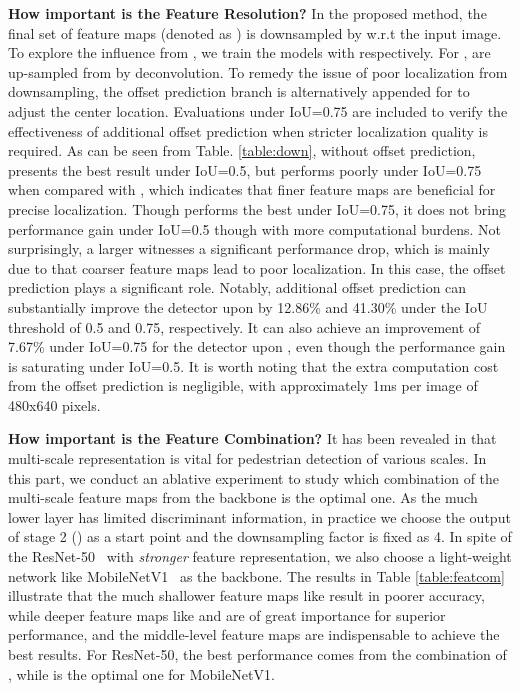 \textbf{How important is the Feature Resolution?}
In the proposed method, the final set of feature maps (denoted as ) is downsampled by  w.r.t the input image. To explore the influence from , we train the models with  respectively. For ,  are up-sampled from  by deconvolution. To remedy the issue of poor localization from downsampling, the offset prediction branch is alternatively appended for  to adjust the center location.
Evaluations under IoU=0.75 are included to verify the effectiveness of additional offset prediction when stricter localization quality is required.
As can be seen from Table. \ref{table:down}, without offset prediction,  presents the best result under IoU=0.5, but performs poorly under IoU=0.75 when compared with , which indicates that finer feature maps are beneficial for precise localization. Though  performs the best under IoU=0.75, it does not bring performance gain under IoU=0.5 though with more computational burdens. Not surprisingly, a larger  witnesses a significant performance drop, which is mainly due to that coarser feature maps lead to poor localization. In this case, the offset prediction plays a significant role. Notably, additional offset prediction can substantially improve the detector upon  by 12.86\% and 41.30\% under the IoU threshold of 0.5 and 0.75, respectively. It can also achieve an improvement of 7.67\% under IoU=0.75 for the detector upon , even though the performance gain is saturating under IoU=0.5. It is worth noting that the extra computation cost from the offset prediction is negligible, with approximately 1ms per image of 480x640 pixels.

\textbf{How important is the Feature Combination?}
It has been revealed in \cite{Song_2018_ECCV} that multi-scale representation is vital for pedestrian detection of various scales. In this part, we conduct an ablative experiment to study which combination of the multi-scale feature maps from the backbone is the optimal one. As the much lower layer has limited discriminant information, in practice we choose the output of stage 2 () as a start point and the downsampling factor  is fixed as 4. In spite of the ResNet-50~\cite{he2016deep} with \emph{stronger} feature representation, we also choose a light-weight network like MobileNetV1~\cite{howard2017mobilenets} as the backbone. The results in Table \ref{table:featcom} illustrate that the much shallower feature maps like  result in poorer accuracy, while deeper feature maps like  and  are of great importance for superior performance, and the middle-level feature maps  are indispensable to achieve the best results. For ResNet-50, the best performance comes from the combination of , while  is the optimal one for MobileNetV1.


